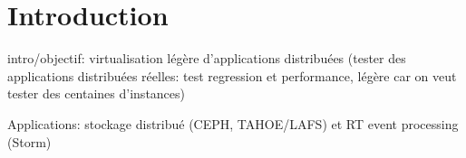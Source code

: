 \section{Introduction}

intro/objectif: virtualisation légère d'applications distribuées (tester des applications distribuées réelles: test regression et performance, légère car on veut tester des centaines d'instances)

Applications: stockage distribué (CEPH, TAHOE/LAFS) et RT event processing (Storm)
